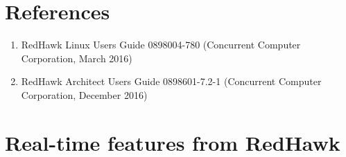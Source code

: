 \documentclass[12pt]{article}
\begin{document}
%
\section{References}

\begin{enumerate}
    \item RedHawk Linux Users Guide 0898004-780 (Concurrent Computer Corporation, March 2016) \label{ref:red_hawk_guide}
    \item RedHawk Architect Users Guide  0898601-7.2-1 (Concurrent Computer Corporation, December 2016) \label{ref:architect}
\end{enumerate}


%
\section{Real-time features from RedHawk}
\label{sec:redhawk_features}
\end{document}
